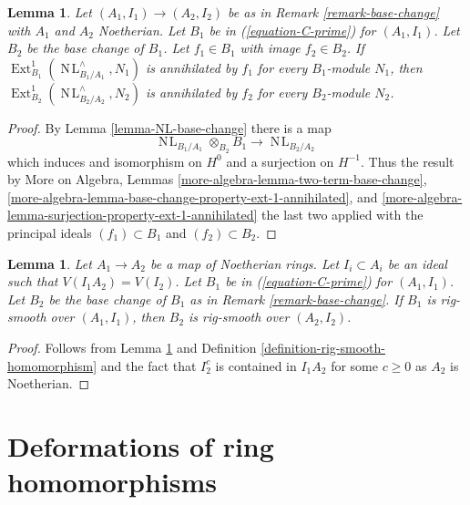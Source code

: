 \documentclass{stacks-project}
\theoremstyle{plain}
\newtheorem{lemma}[subsection]{Lemma}
\theoremstyle{definition}
\theoremstyle{remark}
\numberwithin{equation}{subsection}
\def\Ext{\mathop{\mathrm{Ext}}\nolimits}
\def\NL{\mathop{N\!L}\nolimits}
\begin{document}
\begin{lemma}
\label{lemma-zero-ext-1-after-modding-out}
Let $(A_1, I_1) \to (A_2, I_2)$ be as in
Remark \ref{remark-base-change} with $A_1$ and $A_2$ Noetherian.
Let $B_1$ be in (\ref{equation-C-prime}) for $(A_1, I_1)$.
Let $B_2$ be the base change of $B_1$. Let $f_1 \in B_1$
with image $f_2 \in B_2$.
If $\Ext^1_{B_1}(\NL_{B_1/A_1}^\wedge, N_1)$ is annihilated
by $f_1$ for every $B_1$-module $N_1$, then
$\Ext^1_{B_2}(\NL_{B_2/A_2}^\wedge, N_2)$ is annihilated
by $f_2$ for every $B_2$-module $N_2$.
\end{lemma}

\begin{proof}
By Lemma \ref{lemma-NL-base-change} there is a map
$$
\NL_{B_1/A_1} \otimes_{B_2} B_1 \to \NL_{B_2/A_2}
$$
which induces and isomorphism on $H^0$ and a surjection on $H^{-1}$.
Thus the result by More on Algebra, Lemmas
\ref{more-algebra-lemma-two-term-base-change},
\ref{more-algebra-lemma-base-change-property-ext-1-annihilated}, and
\ref{more-algebra-lemma-surjection-property-ext-1-annihilated}
the last two applied with the principal ideals $(f_1) \subset B_1$ and
$(f_2) \subset B_2$.
\end{proof}

\begin{lemma}
\label{lemma-base-change-rig-smooth-homomorphism}
Let $A_1 \to A_2$ be a map of Noetherian rings. Let $I_i \subset A_i$
be an ideal such that $V(I_1A_2) = V(I_2)$. Let $B_1$ be in
(\ref{equation-C-prime}) for $(A_1, I_1)$.
Let $B_2$ be the base change of $B_1$ as in
Remark \ref{remark-base-change}.
If $B_1$ is rig-smooth over $(A_1, I_1)$,
then $B_2$ is rig-smooth over $(A_2, I_2)$.
\end{lemma}

\begin{proof}
Follows from Lemma \ref{lemma-zero-ext-1-after-modding-out} and
Definition \ref{definition-rig-smooth-homomorphism}
and the fact that $I_2^c$ is contained in $I_1A_2$ for some $c \geq 0$
as $A_2$ is Noetherian.
\end{proof}













\section{Deformations of ring homomorphisms}
\label{section-defos-ring-maps}
\end{document}
